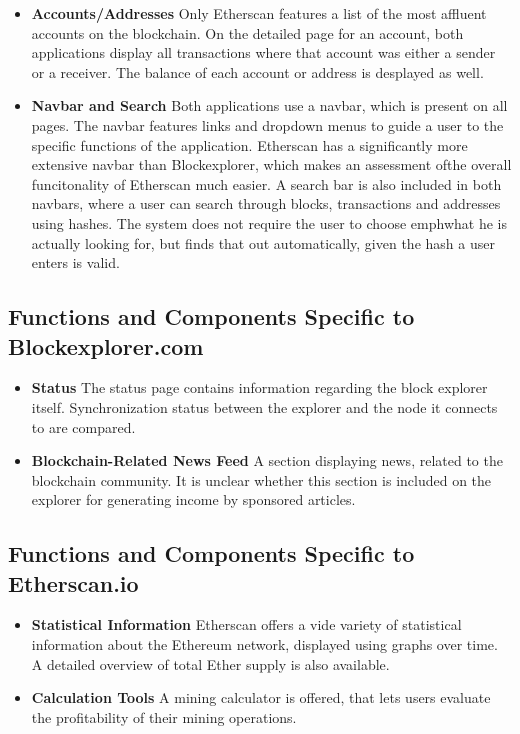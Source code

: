 \begin{itemize}
\item \textbf{Accounts/Addresses}
Only Etherscan features a list of the most affluent accounts on the blockchain. On the detailed page for an account, both applications display all transactions where that account was either a sender or a receiver. The balance of each account or address is desplayed as well.
\item \textbf{Navbar and Search}
Both applications use a navbar, which is present on all pages. The navbar features links and dropdown menus to guide a user to the specific functions of the application. Etherscan has a significantly more extensive navbar than Blockexplorer, which makes an assessment ofthe overall funcitonality of Etherscan much easier. A search bar is also included in both navbars, where a user can search through blocks, transactions and addresses using hashes. The system does not require the user to choose emph{what} he is actually looking for, but finds that out automatically, given the hash a user enters is valid.
\end{itemize}

\subsection{Functions and Components Specific to Blockexplorer.com}

\begin{itemize}
\item \textbf{Status}
The status page contains information regarding the block explorer itself. Synchronization status between the explorer and the node it connects to are compared.
\item \textbf{Blockchain-Related News Feed}
A section displaying news, related to the blockchain community. It is unclear whether this section is included on the explorer for generating income by sponsored articles.
\end{itemize}

\subsection{Functions and Components Specific to Etherscan.io}

\begin{itemize}
\item \textbf{Statistical Information}
Etherscan offers a vide variety of statistical information about the Ethereum network, displayed using graphs over time. A detailed overview of total Ether supply is also available.
\item \textbf{Calculation Tools}
A mining calculator is offered, that lets users evaluate the profitability of their mining operations. 
\end{itemize}

